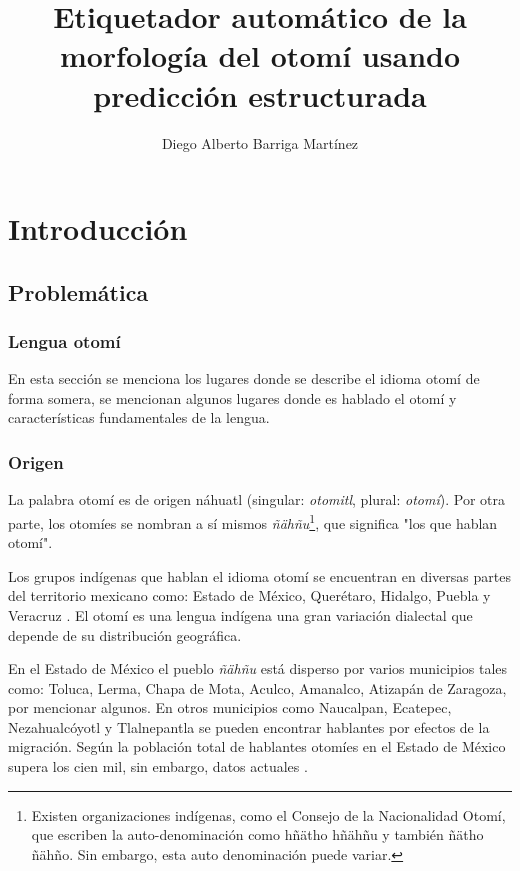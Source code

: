 \documentclass[letterpaper,12pt,oneside]{book}
\begin{document}

\author{Diego Alberto Barriga Martínez}
\title{Etiquetador automático de la morfología del otomí usando predicción estructurada}
\tableofcontents
\maketitle

\chapter{Introducción}

\section{Problemática}

\subsection{Lengua otomí}

En esta sección se menciona los lugares donde se describe el idioma otomí de forma somera, se mencionan algunos lugares donde es hablado el otomí y características fundamentales de la lengua.

\subsection{Origen}

La palabra otomí es de origen náhuatl (singular: \textit{otomitl}, plural: \textit{otomí}). Por otra parte, los otomíes se nombran a sí mismos \textit{ñähñu}\footnote{Existen organizaciones indígenas, como el Consejo de la Nacionalidad Otomí, que escriben la auto-denominación como hñätho hñähñu y también ñätho ñähño. Sin embargo, esta auto denominación puede variar.}, que significa "los que hablan otomí".

Los grupos indígenas que hablan el idioma otomí se encuentran en diversas partes del territorio mexicano como: Estado de México, Querétaro, Hidalgo, Puebla y Veracruz \citep{barrientos2004otomies}. El otomí es una lengua indígena una gran variación dialectal que depende de su distribución geográfica.

En el Estado de México el pueblo \textit{ñähñu} está disperso por varios municipios tales como: Toluca, Lerma, Chapa de Mota, Aculco, Amanalco, Atizapán de Zaragoza, por mencionar algunos. En otros municipios como Naucalpan, Ecatepec, Nezahualcóyotl y Tlalnepantla se pueden encontrar hablantes por efectos de la migración. Según \citet{barrientos2004otomies} la población total de hablantes otomíes en el Estado de México supera los cien mil, sin embargo, datos actuales .
\end{document}
